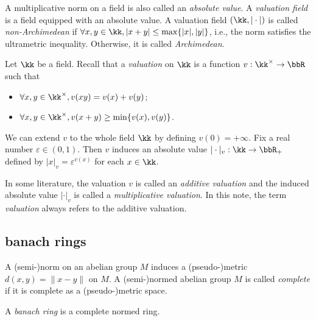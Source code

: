     \begin{definition}\label{def:Archimedean_valuation_field}
        A multiplicative norm on a field is also called an \emph{absolute value}.
        A \emph{valuation field} is a field equipped with an absolute value.
        A valuation field \((\kk, |\cdot|)\) is called \emph{non-Archimedean} if \(\forall x,y \in \kk, |x + y| \leq \max\{|x|, |y|\}\), i.e., the norm satisfies the ultrametric inequality.
        Otherwise, it is called \emph{Archimedean}.
    \end{definition}

    \begin{remark}\label{rmk:additive_and_multiplicative_valuation_on_a_field}
        Let \(\kk\) be a field.
        Recall that a \emph{valuation} on \(\kk\) is a function \(v: \kk^\times \to \bbR\) such that
        \begin{itemize}
            \item \(\forall x,y \in \kk^\times, v(xy) = v(x) + v(y)\);
            \item \(\forall x,y \in \kk^\times, v(x + y) \geq \min\{v(x), v(y)\}\).
        \end{itemize}
        We can extend \(v\) to the whole field \(\kk\) by defining \(v(0) = +\infty\).
        Fix a real number \(\varepsilon \in (0,1)\).
        Then \(v\) induces an absolute value \(|\cdot|_v: \kk \to \bbR_+\) defined by \(|x|_v = \varepsilon^{v(x)}\) for each \(x \in \kk\).

        In some literature, the valuation \(v\) is called an \emph{additive valuation} and the induced absolute value \(|\cdot|_v\) is called a \emph{multiplicative valuation}.
        In this note, the term \emph{valuation} always refers to the additive valuation.
    \end{remark}

\subsection{banach rings}

    \begin{definition}\label{def:complete_semi-normed_abelian_group}
        A (semi-)norm on an abelian group \(M\) induces a (pseudo-)metric \(d(x,y) = \|x - y\|\) on \(M\).
        A (semi-)normed abelian group \(M\) is called \emph{complete} if it is complete as a (pseudo-)metric space.
    \end{definition}

    \begin{definition}\label{def:banach_ring}
        A \emph{banach ring} is a complete normed ring.
    \end{definition}

